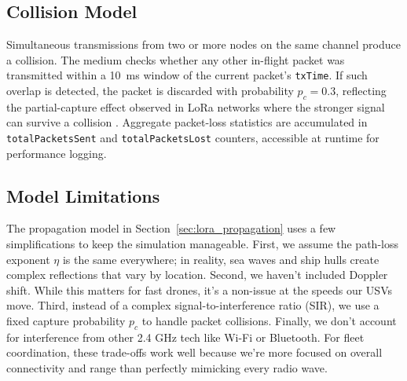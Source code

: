 \subsection{Collision Model}
\label{sec:lora_collision}

Simultaneous transmissions from two or more nodes on the same channel
produce a collision. The medium checks whether any other in-flight
packet was transmitted within a 10~ms window of the current packet's
\texttt{txTime}. If such overlap is detected, the packet is discarded
with probability $p_c = 0.3$, reflecting the partial-capture effect
observed in LoRa networks where the stronger signal can survive a
collision \cite{bor2016lora}. Aggregate packet-loss statistics are
accumulated in \texttt{totalPacketsSent} and \texttt{totalPacketsLost}
counters, accessible at runtime for performance logging.



\subsection{Model Limitations}
\label{sec:lora_limitations}

The propagation model in Section~\ref{sec:lora_propagation} uses a few 
simplifications to keep the simulation manageable. First, we assume the path-loss exponent $\eta$ is the same everywhere; in reality, sea waves and ship hulls create complex reflections that vary by location. Second, we haven't included Doppler shift. 
While this matters for fast drones, it’s a non-issue at the speeds our USVs move. Third, instead of a complex signal-to-interference ratio (SIR), we use a fixed capture probability $p_c$ to handle packet collisions. Finally, we don't account for 
interference from other 2.4 GHz tech like Wi-Fi or Bluetooth. For fleet 
coordination, these trade-offs work well because we’re more focused on overall 
connectivity and range than perfectly mimicking every radio wave.

